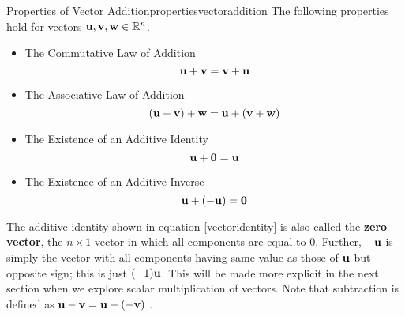 \begin{theorem}{Properties of Vector Addition}{propertiesvectoraddition}
The following properties hold for vectors $\mathbf{u},\mathbf{v}, \mathbf{w} \in \mathbb{R}^{n}$.
\begin{itemize}
\item The Commutative Law of Addition
\begin{equation*}
\mathbf{u}+\mathbf{v}=\mathbf{v}+\mathbf{u}
\end{equation*}
\item The Associative Law of Addition
\begin{equation*}
\left( \mathbf{u}+\mathbf{v}\right) +\mathbf{w}=\mathbf{u}+\left( \mathbf{v}+\mathbf{w}\right)
\end{equation*}
\item The Existence of an Additive Identity
\begin{equation}
\mathbf{u}+\mathbf{0}=\mathbf{u}
\label{vectoridentity} 
\end{equation}
\item The Existence of an Additive Inverse
\begin{equation*}
\mathbf{u}+\left( -\mathbf{u}\right) =\mathbf{0}  
\end{equation*}
\end{itemize}
\end{theorem}

The additive identity shown in equation
\ref{vectoridentity} is also called the \textbf{zero vector}, 
the $n \times 1$ vector in which all components are equal to $0$.
Further, $-\mathbf{u}$ is simply the vector with all components having
same value as those of $\mathbf{u}$ but opposite sign; this is just
$(-1)\mathbf{u}$. This will be made more explicit in the next
section when we explore scalar multiplication of vectors. Note that subtraction is defined as $\mathbf{u}-\mathbf{v} = \mathbf{u}+\left(
-\mathbf{v} \right)$ .
